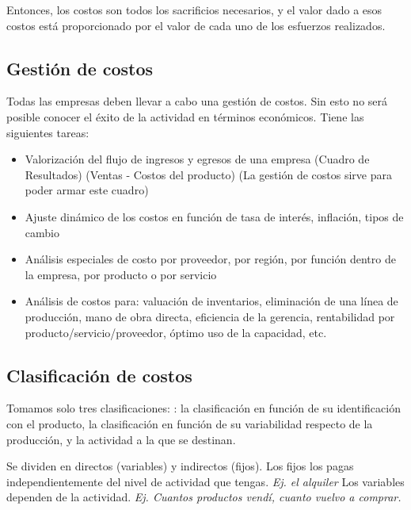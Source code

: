 \documentclass[titlepage,a4paper]{article}
\begin{document}
Entonces, los costos son todos los sacrificios necesarios, y el valor dado a esos costos
está proporcionado por el valor de cada uno de los esfuerzos realizados.

\subsection{Gestión de costos}
Todas las empresas deben llevar a cabo una gestión de costos. Sin esto no será posible conocer el éxito de la actividad en términos económicos. Tiene las siguientes tareas:
\begin{itemize}
    \item Valorización del flujo de ingresos y egresos de una empresa (Cuadro de Resultados) (Ventas - Costos del producto) (La gestión de costos sirve para poder armar este cuadro)
    \item Ajuste dinámico de los costos en función de tasa de interés, inflación, tipos de cambio
    \item Análisis especiales de costo por proveedor, por región, por función dentro de la empresa, por producto o por servicio
    \item Análisis de costos para: valuación de inventarios, eliminación de una línea de producción, mano de obra directa, eficiencia de la gerencia, rentabilidad por producto/servicio/proveedor, óptimo uso de la capacidad, etc.
\end{itemize}

\subsection{Clasificación de costos}
Tomamos solo tres clasificaciones: : la clasificación en función de su identificación con el producto, la clasificación en 
función de su variabilidad respecto de la producción, y la actividad a la que se destinan.

Se dividen en directos (variables) y indirectos (fijos). Los fijos los pagas independientemente del nivel de actividad que tengas. \textit{Ej. el alquiler} Los variables dependen de la actividad. \textit{Ej. Cuantos productos vendí, cuanto vuelvo a comprar.}
\end{document}
